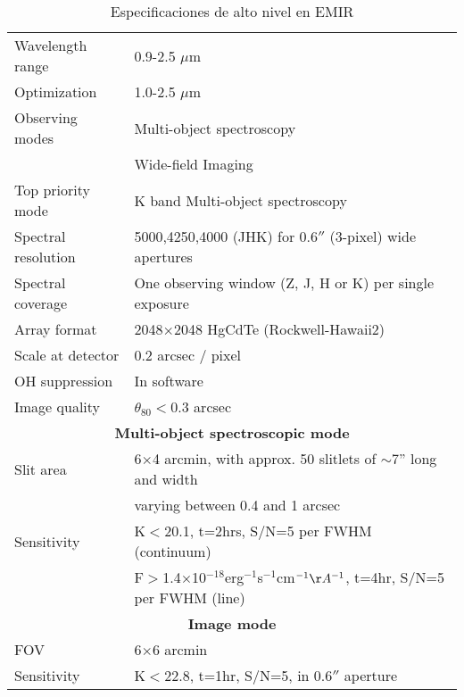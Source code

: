 \begin{table*}
\centering
\begin{tabular}{|l l|}
\hline
Wavelength range & 0.9-2.5 $\mu$m \\
Optimization & 1.0-2.5 $\mu$m \\
Observing modes &  Multi-object spectroscopy \\
& Wide-field Imaging \\
Top priority mode &  K band Multi-object spectroscopy \\
Spectral resolution & 5000,4250,4000 (JHK) for 0.6$''$ (3-pixel) wide apertures \\
Spectral coverage & One observing window (Z, J, H or K) per single exposure \\
Array format & 2048$\times$2048 HgCdTe (Rockwell-Hawaii2) \\
Scale at detector &  0.2 arcsec / pixel \\
OH suppression & In software \\
Image quality  & $\theta_{80}< 0.3$ arcsec \\
\multicolumn{2}{|c|}{\textbf{Multi-object spectroscopic mode}} \\
Slit area & 6$\times$4 arcmin, with approx. 50 slitlets of $\sim$7'' long and width \\
          & varying between 0.4 and 1 arcsec \\
Sensitivity & K$<$20.1, t=2hrs, S/N=5 per FWHM (continuum) \\
            & F$>$1.4$\times$10$^{-18}$erg$^{-1}$s$^{-1}$cm$^{-1}\AA^{-1}$, t=4hr, S/N=5 per FWHM (line) \\
\multicolumn{2}{|c|}{\textbf{Image mode}} \\
FOV & 6$\times$6 arcmin \\
Sensitivity &  K$<$22.8, t=1hr, S/N=5, in 0.6$''$ aperture  \\
\hline
\end{tabular}
\caption{Especificaciones de alto nivel en EMIR}
\label{tabla:especificaciones}
\end{table*}

